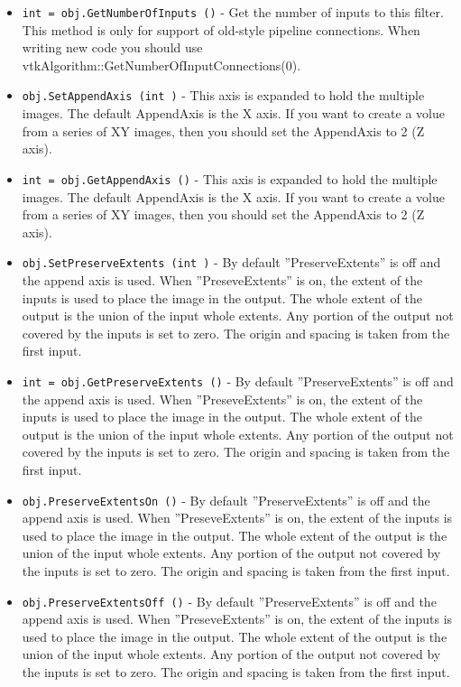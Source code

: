 \begin{itemize}
\item  \verb|int = obj.GetNumberOfInputs ()| -  Get the number of inputs to this filter. This method is only for
 support of old-style pipeline connections.  When writing new code
 you should use vtkAlgorithm::GetNumberOfInputConnections(0).

\item  \verb|obj.SetAppendAxis (int )| -  This axis is expanded to hold the multiple images.
 The default AppendAxis is the X axis.
 If you want to create a volue from a series of XY images, then you should
 set the AppendAxis to 2 (Z axis).

\item  \verb|int = obj.GetAppendAxis ()| -  This axis is expanded to hold the multiple images.
 The default AppendAxis is the X axis.
 If you want to create a volue from a series of XY images, then you should
 set the AppendAxis to 2 (Z axis).

\item  \verb|obj.SetPreserveExtents (int )| -  By default ''PreserveExtents'' is off and the append axis is used.
 When ''PreseveExtents'' is on, the extent of the inputs is used to
 place the image in the output.  The whole extent of the output is
 the union of the input whole extents.  Any portion of the
 output not covered by the inputs is set to zero.  The origin and
 spacing is taken from the first input.

\item  \verb|int = obj.GetPreserveExtents ()| -  By default ''PreserveExtents'' is off and the append axis is used.
 When ''PreseveExtents'' is on, the extent of the inputs is used to
 place the image in the output.  The whole extent of the output is
 the union of the input whole extents.  Any portion of the
 output not covered by the inputs is set to zero.  The origin and
 spacing is taken from the first input.

\item  \verb|obj.PreserveExtentsOn ()| -  By default ''PreserveExtents'' is off and the append axis is used.
 When ''PreseveExtents'' is on, the extent of the inputs is used to
 place the image in the output.  The whole extent of the output is
 the union of the input whole extents.  Any portion of the
 output not covered by the inputs is set to zero.  The origin and
 spacing is taken from the first input.

\item  \verb|obj.PreserveExtentsOff ()| -  By default ''PreserveExtents'' is off and the append axis is used.
 When ''PreseveExtents'' is on, the extent of the inputs is used to
 place the image in the output.  The whole extent of the output is
 the union of the input whole extents.  Any portion of the
 output not covered by the inputs is set to zero.  The origin and
 spacing is taken from the first input.

\end{itemize}
